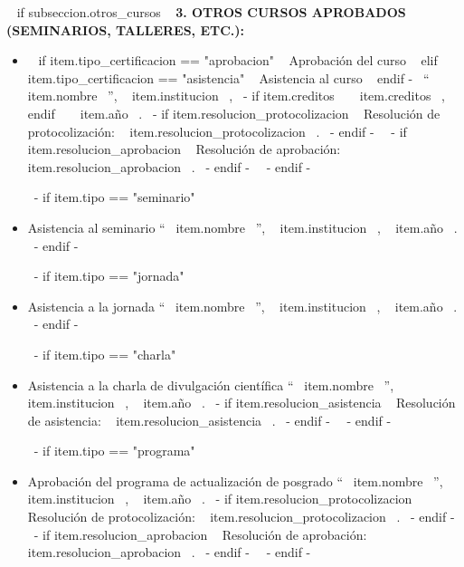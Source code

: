     ~{ if subseccion.otros_cursos }~
      \textbf{3. OTROS CURSOS APROBADOS (SEMINARIOS, TALLERES, ETC.):}
      \begin{itemize}
      ~{ for item in subseccion.otros_cursos }~
        ~{- if item.tipo == "curso" }~
          \item ~{ if item.tipo_certificacion == "aprobacion" }~ Aprobación del curso ~{ elif item.tipo_certificacion == "asistencia" }~ Asistencia al curso ~{ endif -}~
                ``~{{ item.nombre }}~'', ~{{ item.institucion }}~,
                ~{- if item.creditos }~ ~{{ item.creditos }}~, ~{ endif }~ ~{{ item.año }}~.
                ~{- if item.resolucion_protocolizacion }~ Resolución de protocolización: ~{{ item.resolucion_protocolizacion }}~. ~{- endif -}~
                ~{- if item.resolucion_aprobacion }~ Resolución de aprobación: ~{{ item.resolucion_aprobacion }}~. ~{- endif -}~
          \espacioEntreItems{}
        ~{- endif -}~

        ~{- if item.tipo == "seminario" }~
          \item Asistencia al seminario ``~{{ item.nombre }}~'', ~{{ item.institucion }}~, ~{{ item.año }}~.
          \espacioEntreItems{}
        ~{- endif -}~

        ~{- if item.tipo == "jornada" }~
          \item Asistencia a la jornada ``~{{ item.nombre }}~'', ~{{ item.institucion }}~, ~{{ item.año }}~.
          \espacioEntreItems{}
        ~{- endif -}~

        ~{- if item.tipo == "charla" }~
          \item Asistencia a la charla de divulgación científica ``~{{ item.nombre }}~'', ~{{ item.institucion }}~, ~{{ item.año }}~.
                ~{- if item.resolucion_asistencia }~ Resolución de asistencia: ~{{ item.resolucion_asistencia }}~. ~{- endif -}~
          \espacioEntreItems{}
        ~{- endif -}~

        ~{- if item.tipo == "programa" }~
          \item Aprobación del programa de actualización de posgrado ``~{{ item.nombre }}~'', ~{{ item.institucion }}~, ~{{ item.año }}~.
                ~{- if item.resolucion_protocolizacion }~ Resolución de protocolización: ~{{ item.resolucion_protocolizacion }}~. ~{- endif -}~
                ~{- if item.resolucion_aprobacion }~ Resolución de aprobación: ~{{ item.resolucion_aprobacion }}~. ~{- endif -}~
          \espacioEntreItems{}
        ~{- endif -}~


\end{itemize}
